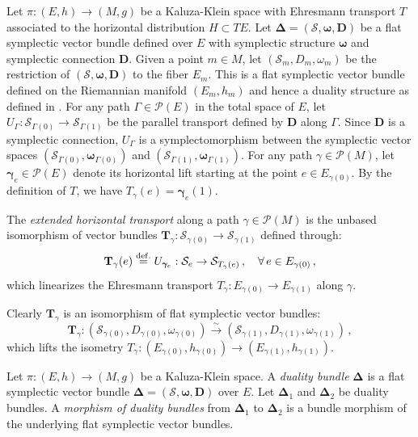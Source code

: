 \documentclass[10pt, cmp, numbook, final, a4paper]{svjour}
\newcommand{\bDelta}{\boldsymbol{\Delta}}
\newcommand{\eqdef}{\stackrel{{\rm def.}}{=}}
\def\bD{\mathbb{D}}
\def\bomega{\boldsymbol{\omega}}
\newcommand{\be}{\begin{equation*}}
\newcommand{\ee}{\end{equation*}}
\def\cP{\mathcal{P}}
\def\cS{\mathcal{S}}
\def\mT{\mathbf{T}}
\def\bD{\mathbf{D}}
\def\bomega{\boldsymbol{\omega}}
\def\bgamma{\boldsymbol{\gamma}}
\def\bcS{\boldsymbol{\mathcal{S}}}
\def\bD{\mathbf{D}}
\begin{document}
Let $\pi:(E,h)\rightarrow (M,g)$ be a Kaluza-Klein space with
Ehresmann transport $T$ associated to the horizontal distribution
$H\subset TE$. Let $\bDelta = (\bcS,\bomega,\bD)$ be a flat symplectic
vector bundle defined over $E$ with symplectic structure $\bomega$ and
symplectic connection $\bD$. Given a point $m\in M$, let
$(\cS_m,D_m,\omega_m)$ be the restriction of $(\bcS,\bomega,\bD)$ to
the fiber $E_m$. This is a flat symplectic vector bundle defined on
the Riemannian manifold $(E_m,h_m)$ and hence a duality structure as
defined in \cite{GESM}. For any path $\Gamma\in\cP(E)$ in the total
space of $E$, let $U_\Gamma:\bcS_{\Gamma(0)}\rightarrow
\bcS_{\Gamma(1)}$ be the parallel transport defined by $\bD$ along
$\Gamma$. Since $\bD$ is a symplectic connection, $U_\Gamma$ is a
symplectomorphism between the symplectic vector spaces
$(\bcS_{\Gamma(0)}, \bomega_{\Gamma(0)})$ and
$(\bcS_{\Gamma(1)},\bomega_{\Gamma(1)})$. For any path $\gamma\in
\cP(M)$, let $\bgamma_e\in \cP(E)$ denote its horizontal lift starting
at the point $e\in E_{\gamma(0)}$. By the definition of $T$, we have
$T_\gamma(e) = \bgamma_e(1)$.
	
\begin{definition}
The {\em extended horizontal transport} along a path
$\gamma\in \cP(M)$ is the unbased isomorphism of vector bundles
$\mT_\gamma:\cS_{\gamma(0)}\rightarrow \cS_{\gamma(1)}$ defined
through:
\be
\mT_\gamma(e)\eqdef U_{\bgamma_e}:\cS_{e}\rightarrow \cS_{T_\gamma(e)}\, , \quad \forall\, e\in E_{\gamma(0)}\, ,
\ee
which linearizes the Ehresmann transport $T_\gamma:E_{\gamma(0)}\rightarrow E_{\gamma(1)}$ along $\gamma$.
\end{definition}

\noindent 
Clearly $\mT_\gamma$ is an isomorphism of flat symplectic vector bundles:
\begin{equation*}
\mT_\gamma\colon (\cS_{\gamma(0)},D_{\gamma(0)},\omega_{\gamma(0)})\xrightarrow{\sim}(\cS_{\gamma(1)},D_{\gamma(1)},\omega_{\gamma(1)})\, ,
\end{equation*}
which lifts the isometry $T_\gamma:(E_{\gamma(0)}, h_{\gamma(0)})\rightarrow	(E_{\gamma(1)}, h_{\gamma(1)})$.

\begin{definition}
Let $\pi\colon (E,h)\to (M,g)$ be a Kaluza-Klein space. A
\emph{duality bundle} $\bDelta$ is a flat symplectic vector bundle
$\bDelta = (\bcS,\bomega,\bD)$ over $E$. Let $\bDelta_{1}$ and
$\bDelta_{2}$ be duality bundles. A \emph{morphism of duality bundles}
from $\bDelta_{1}$ to $\bDelta_{2}$ is a bundle morphism of the
underlying flat symplectic vector bundles.
\end{definition}
\end{document}
